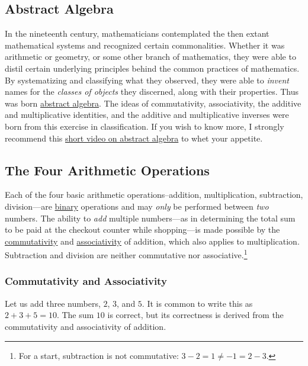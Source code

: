 \documentclass[
  a4paper,
]{article}
\begin{document}
\subsection{Abstract Algebra}\label{abstract-algebra}

In the nineteenth century, mathematicians contemplated the then extant
mathematical systems and recognized certain commonalities. Whether it
was arithmetic or geometry, or some other branch of mathematics, they
were able to distil certain underlying principles behind the common
practices of mathematics. By systematizing and classifying what they
observed, they were able to \emph{invent} names for the \emph{classes of
objects} they discerned, along with their properties. Thus was born
\href{https://en.wikipedia.org/wiki/Abstract_algebra}{abstract algebra}.
The ideas of commutativity, associativity, the additive and
multiplicative identities, and the additive and multiplicative inverses
were born from this exercise in classification. If you wish to know
more, I strongly recommend this
\href{https://www.youtube.com/watch?v=IP7nW_hKB7I}{short video on
abstract algebra} to whet your appetite.

\subsection{The Four Arithmetic
Operations}\label{the-four-arithmetic-operations}

Each of the four basic arithmetic operations--addition, multiplication,
subtraction, division---are
\href{https://en.wikipedia.org/w/index.php?title=Binary_operation&oldid=1182322931}{binary}
operations and may \emph{only} be performed between \emph{two} numbers.
The ability to \emph{add} multiple numbers---as in determining the total
sum to be paid at the checkout counter while shopping---is made possible
by the
\href{https://en.wikipedia.org/wiki/Commutative_property}{commutativity}
and
\href{https://en.wikipedia.org/wiki/Associative_property}{associativity}
of addition, which also applies to multiplication. Subtraction and
division are neither commutative nor associative.\footnote{For a start,
  subtraction is not commutative: \(3 - 2 = 1 \ne -1 = 2 - 3\).}

\subsubsection{Commutativity and
Associativity}\label{commutativity-and-associativity}

Let us add three numbers, \(2\), \(3\), and \(5\). It is common to write
this as \(2 + 3 + 5 = 10\). The sum \(10\) is correct, but its
correctness is derived from the commutativity and associativity of
addition.
\end{document}
